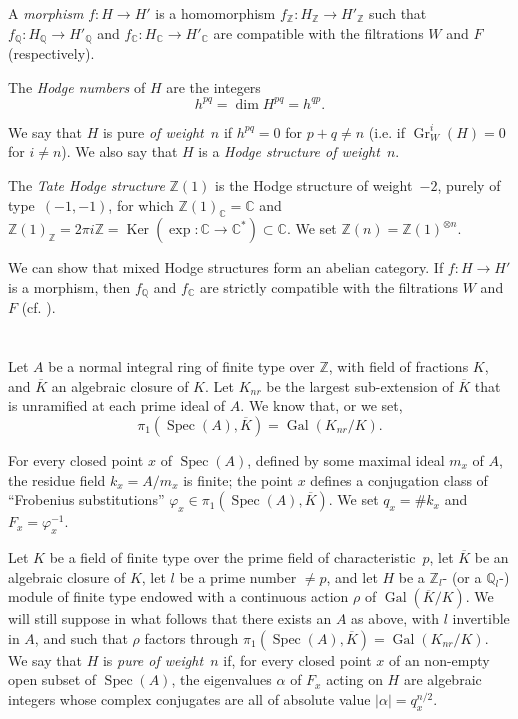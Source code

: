 \documentclass{article}
\theoremstyle{plain}
\theoremstyle{definition}
\newcommand{\ZZ}{\mathbb{Z}}
\newcommand{\QQ}{\mathbb{Q}}
\newcommand{\CC}{\mathbb{C}}
\DeclareMathOperator{\Gr}{Gr}
\DeclareMathOperator{\Ker}{Ker}
\DeclareMathOperator{\Gal}{Gal}
\DeclareMathOperator{\Spec}{Spec}
\newcommand{\oldpage}[1]{\marginpar{\footnotesize$\Big\vert$ \textit{p.~#1}}}
\begin{document}
A \emph{morphism} $f\colon H\to H'$ is a homomorphism $f_\ZZ\colon H_\ZZ\to H'_\ZZ$ such that $f_\QQ\colon H_\QQ\to H'_\QQ$ and $f_\CC\colon H_\CC\to H'_\CC$ are compatible with the filtrations $W$ and $F$ (respectively).

The \emph{Hodge numbers} of $H$ are the integers
\[
  h^{pq} = \dim H^{pq} = h^{qp}.
\tag{1.2}
\]

We say that $H$ is pure \emph{of weight~$n$} if $h^{pq}=0$ for $p+q\neq n$ (i.e. if $\Gr_W^i(H)=0$ for $i\neq n$).
We also say that $H$ is a \emph{Hodge structure of weight~$n$}.

The \emph{Tate Hodge structure} $\ZZ(1)$ is the Hodge structure of weight~$-2$, purely of type~$(-1,-1)$, for which $\ZZ(1)_\CC=\CC$ and $\ZZ(1)_\ZZ = 2\pi i\ZZ = \Ker(\exp\colon\CC\to\CC^*)\subset\CC$.
We set $\ZZ(n)=\ZZ(1)^{\otimes n}$.

We can show that mixed Hodge structures form an abelian category.
If $f\colon H\to H'$ is a morphism, then $f_\QQ$ and $f_\CC$ are strictly compatible with the filtrations $W$ and $F$ (cf. \cite[2.3.5]{1}).


\section{}
\label{2}

Let $A$ be a normal integral ring of finite type over $\ZZ$, with field of fractions $K$,
\oldpage{426}
and $\overline{K}$ an algebraic closure of $K$.
Let $K_{nr}$ be the largest sub-extension of $\overline{K}$ that is unramified at each prime ideal of $A$.
We know that, or we set,
\[
  \pi_1(\Spec(A),\overline{K}) = \Gal(K_{nr}/K).
\]

For every closed point $x$ of $\Spec(A)$, defined by some maximal ideal $m_x$ of $A$, the residue field $k_x=A/m_x$ is finite;
the point $x$ defines a conjugation class of ``Frobenius substitutions'' $\varphi_x\in\pi_1(\Spec(A),\overline{K})$.
We set $q_x=\#k_x$ and $F_x=\varphi_x^{-1}$.

Let $K$ be a field of finite type over the prime field of characteristic~$p$, let $\overline{K}$ be an algebraic closure of $K$, let $l$ be a prime number $\neq p$, and let $H$ be a $\ZZ_l$- (or a $\QQ_l$-) module of finite type endowed with a continuous action $\rho$ of $\Gal(\overline{K}/K)$.
We will still suppose in what follows that there exists an $A$ as above, with $l$ invertible in $A$, and such that $\rho$ factors through $\pi_1(\Spec(A),\overline{K}) = \Gal(K_{nr}/K)$.
We say that $H$ is \emph{pure of weight~$n$} if, for every closed point $x$ of an non-empty open subset of $\Spec(A)$, the eigenvalues $\alpha$ of $F_x$ acting on $H$ are algebraic integers whose complex conjugates are all of absolute value $|\alpha|=q_x^{n/2}$.
\end{document}
